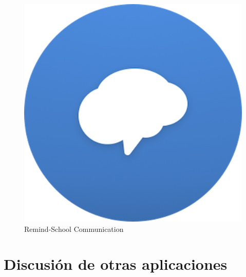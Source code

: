             \begin{figure}[H]
                \centering
                \includegraphics[scale=0.4]{Propuesta_Plantilla_Tesis_LaTeX_UAG/imagenes/remind.png}
                \caption{Remind-School Communication}
                \label{fig:remind}
            \end{figure}


    \section{Discusión de otras aplicaciones}
    
